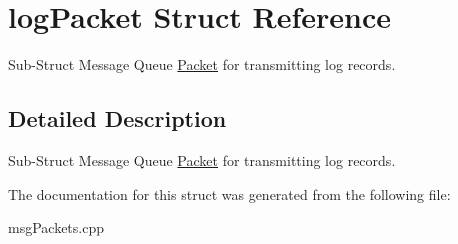 \hypertarget{structlogPacket}{\section{log\-Packet Struct Reference}
\label{structlogPacket}
}


Sub-\/\-Struct Message Queue \hyperlink{structPacket}{Packet} for transmitting log records.  




\subsection{Detailed Description}
Sub-\/\-Struct Message Queue \hyperlink{structPacket}{Packet} for transmitting log records. 

The documentation for this struct was generated from the following file\-:\begin{DoxyCompactItemize}
\item 
msg\-Packets.\-cpp\end{DoxyCompactItemize}
